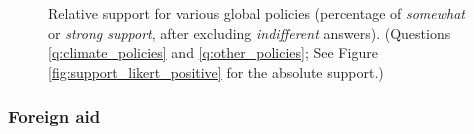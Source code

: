 \setcounter{figure}{2}
\renewcommand{\thefigure}{\arabic{figure}}
\begin{figure}
  \caption[Relative support for further global policies]{Relative support for various global policies (percentage of \textit{somewhat} or \textit{strong support}, after excluding \textit{indifferent} answers). (Questions \ref{q:climate_policies} and \ref{q:other_policies}; See Figure \ref{fig:support_likert_positive} for the absolute support.)%
  }
  \label{fig:support}
\end{figure} 
\renewcommand{\thefigure}{S\arabic{figure}}

\subsubsection{Foreign aid}\label{subsubsec:support_foreign_aid} %

